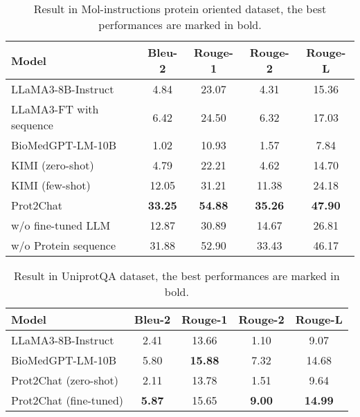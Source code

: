\begin{table*}[!ht]
    \centering
    \renewcommand{\arraystretch}{1.25}
    \begin{tabular}{l|c|c|c|c}
    \hline
        Model & Bleu-2 & Rouge-1 & Rouge-2 & Rouge-L    \\ 
        \hline
        LLaMA3-8B-Instruct & 4.84 & 23.07 & 4.31 & 15.36  \\ \hline
        LLaMA3-FT with sequence& 6.42 & 24.50  & 6.32 & 17.03\\ \hline
        BioMedGPT-LM-10B & 1.02 & 10.93 & 1.57 & 7.84  \\ \hline
        KIMI (zero-shot)& 4.79 & 22.21 & 4.62 & 14.70  \\ \hline
        KIMI (few-shot) & 12.05 & 31.21 & 11.38 & 24.18   \\ \hline
        
        Prot2Chat  & \textbf{33.25}  & \textbf{54.88} & \textbf{35.26} & \textbf{47.90}  \\ \hline
       
        
        w/o fine-tuned LLM& 12.87 & 30.89 & 14.67 & 26.81  \\ \hline
        w/o Protein sequence & 31.88 & 52.90 & 33.43 & 46.17 \\ \hline
    \end{tabular}
    \caption{Result in Mol-instructions protein oriented dataset, the best performances are marked in bold.}
    \label{tab:result1}
\end{table*}

\begin{table*}[!ht]
    \centering
    \renewcommand{\arraystretch}{1.25}
    \begin{tabular}{l|c|c|c|c}
    \hline
        Model & Bleu-2 & Rouge-1 & Rouge-2 & Rouge-L    \\ 
        \hline
        LLaMA3-8B-Instruct & 2.41  & 13.66 & 1.10  & 9.07  \\ \hline
        BioMedGPT-LM-10B & 5.80  & \textbf{15.88} & 7.32 & 14.68  \\ \hline
        Prot2Chat (zero-shot)& 2.11 & 13.78 & 1.51 & 9.64  \\ \hline
        
        Prot2Chat (fine-tuned) & \textbf{5.87} & 15.65 & \textbf{9.00}  & \textbf{14.99}  \\ \hline
    \end{tabular}
    \caption{Result in UniprotQA dataset, the best performances are marked in bold.}
    \label{tab:result2}
\end{table*}

